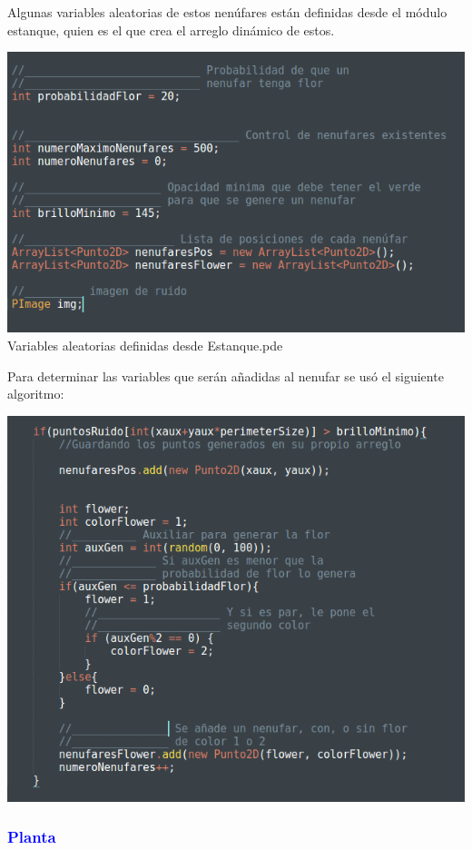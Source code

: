 \documentclass[11pt,a4paper]{article}
\begin{document}
			Algunas variables aleatorias de estos nenúfares están definidas desde el módulo estanque, quien es el que crea el arreglo dinámico de estos.

			\begin{center}
			\includegraphics[scale=.5]{CAP5}\\
			{\tiny Variables aleatorias definidas desde Estanque.pde}
			\end{center}

			Para determinar las variables que serán añadidas al nenufar se usó el siguiente algoritmo:
			\begin{center}
			\includegraphics[scale =.5]{CAP6}
			\end{center}
		
		\subsubsection{\textcolor{blue}{Planta}}
			
\end{document}
